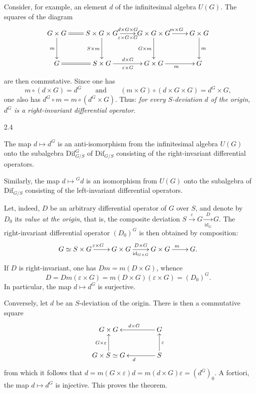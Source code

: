 Consider, for example, an element $d$ of the infinitesimal algebra $U(G)$. The squares of the diagram
\[
\xymatrix@C=2.2em@R=3em{G\times G\ar@{=}[r]\ar[d]_m&S\times G\times G\ar[r]^{d\times G\times G}_{\varepsilon\times G\times G}\ar[d]_{S\times m}&G\times G\times G\ar[r]^{m\times G}\ar[d]_{G\times m}&G\times G\ar[d]^m\\
G\ar@{=}[r]&S\times G\ar[r]^{d\times G}_{\varepsilon\times G}&G\times G\ar[r]_m&G}
\]
are then commutative. Since one has
\[
m\circ(d\times G)=d^G\qquad\text{and}\qquad(m\times G)\circ(d\times G\times G)=d^G\times G,
\]
one also has $d^G\circ m=m\circ(d^G\times G)$. Thus: \emph{for every $S$-deviation $d$ of the origin, $d^G$ is a right-invariant differential operator}.

\begin{theorem}{2.4}\label{VIIA.2.4}
\begin{enumeratei}
\item The map $d\mapsto d^G$ is an anti-isomorphism from the infinitesimal algebra $U(G)$ onto the subalgebra $\mathrm{Dif}_{G/S}^G$ of $\mathrm{Dif}_{G/S}$ consisting of the right-invariant differential operators.
\item Similarly, the map $d\mapsto{}^Gd$ is an isomorphism from $U(G)$ onto the subalgebra of $\mathrm{Dif}_{G/S}$ consisting of the left-invariant differential operators.
\end{enumeratei}
\end{theorem}

Let, indeed, $D$ be an arbitrary differential operator of $G$ over $S$, and denote by $D_0$ its \emph{value at the origin}, that is, the composite deviation $S\xrightarrow{\varepsilon}G\mathrel{\mathop{\longrightarrow}\limits^D_{\mathrm{id}_G}}G$. The right-invariant differential operator $(D_0)^G$ is then obtained by composition:
\[
\xymatrix@C=2.3em{G\simeq S\times G\ar[r]^{\varepsilon\times G}&G\times G\ar[r]^{D\times G}_{\mathrm{id}_{G\times G}}&G\times G\ar[r]^m&G.}
\]
If $D$ is right-invariant, one has $Dm=m(D\times G)$, whence
\[
D=Dm(\varepsilon\times G)=m(D\times G)(\varepsilon\times G)=(D_0)^G.
\]
In particular, the map $d\mapsto d^G$ is surjective.

Conversely, let $d$ be an $S$-deviation of the origin. There is then a commutative square
\[
\xymatrix@C=4em{G\times G&G\ar[l]_{d\times G}\\
G\times S\simeq G\ar[u]^{G\times\varepsilon}&S\ar[u]_\varepsilon\ar[l]^d}
\]
from which it follows that $d=m(G\times\varepsilon)d=m(d\times G)\varepsilon=(d^G)_0$. A fortiori, the map $d\mapsto d^G$ is injective. This proves the theorem.

